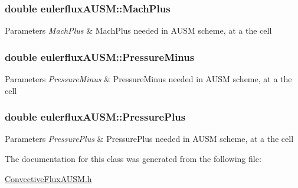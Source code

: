 \subsubsection[{\texorpdfstring{Mach\+Plus}{MachPlus}}]{\setlength{\rightskip}{0pt plus 5cm}double eulerflux\+A\+U\+S\+M\+::\+Mach\+Plus}\hypertarget{classeulerfluxAUSM_a9565c076f0be6c66124056ed3fff66b7}{}\label{classeulerfluxAUSM_a9565c076f0be6c66124056ed3fff66b7}

\begin{DoxyParams}{Parameters}
{\em Mach\+Plus} & Mach\+Plus needed in A\+U\+SM scheme, at a the cell \\
\hline
\end{DoxyParams}
\subsubsection[{\texorpdfstring{Pressure\+Minus}{PressureMinus}}]{\setlength{\rightskip}{0pt plus 5cm}double eulerflux\+A\+U\+S\+M\+::\+Pressure\+Minus}\hypertarget{classeulerfluxAUSM_a509830d732c5117ce212397b07e60720}{}\label{classeulerfluxAUSM_a509830d732c5117ce212397b07e60720}

\begin{DoxyParams}{Parameters}
{\em Pressure\+Minus} & Pressure\+Minus needed in A\+U\+SM scheme, at a the cell \\
\hline
\end{DoxyParams}
\subsubsection[{\texorpdfstring{Pressure\+Plus}{PressurePlus}}]{\setlength{\rightskip}{0pt plus 5cm}double eulerflux\+A\+U\+S\+M\+::\+Pressure\+Plus}\hypertarget{classeulerfluxAUSM_abfd3213993dd4b53b12c3f5ecd7046e5}{}\label{classeulerfluxAUSM_abfd3213993dd4b53b12c3f5ecd7046e5}

\begin{DoxyParams}{Parameters}
{\em Pressure\+Plus} & Pressure\+Plus needed in A\+U\+SM scheme, at a the cell \\
\hline
\end{DoxyParams}


The documentation for this class was generated from the following file\+:\begin{DoxyCompactItemize}
\item 
\hyperlink{ConvectiveFluxAUSM_8h}{Convective\+Flux\+A\+U\+S\+M.\+h}\end{DoxyCompactItemize}
